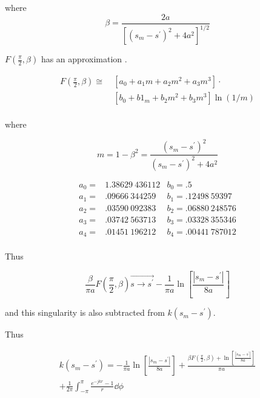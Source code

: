 \documentclass[12pt]{article}
\begin{document}
\noindent where
\[ \beta=\frac{2a}{\left[(s_m-s^\prime)^2+4a^2\right]^{1/2}}
\]

\noindent $F(\frac{\pi}{2},\beta)$ has an approximation \cite{r6}.

\begin{equation}
\begin{aligned}
F\left(\frac{\pi}{2}, \beta\right) \cong\
& [a_0 + a_1m + a_2m^2 + a_3m^3] \cdot     \\
& [b_0 + b1_m + b_2m^2 + b_3m^3]\ln(1/m)    \\
\end{aligned}
\label{eq17}
\end{equation}

where

\[
m = 1 - \beta^2 = \frac{(s_m - s^\prime)^2}{(s_m - s^\prime)^2 + 4a^2}
\]

\[
\begin{array}{lrl}
a_0 = & 1.38629\ 436112 & b_0 = .5            \\
a_1 = &  .09666\ 344259 & b_1 = .12498\ 59397  \\
a_2 = &  .03590\ 092383 & b_2 = .06880\ 248576 \\
a_3 = &  .03742\ 563713 & b_3 = .03328\ 355346 \\
a_4 = &  .01451\ 196212 & b_4 = .00441\ 787012 \\
\end{array}
\]

Thus

\begin{equation}
\frac{\beta}{\pi a}F\left(\frac{\pi}{2},\beta\right)
\overrightarrow{s\rightarrow s^\prime}
-\frac{1}{\pi a}\ln\left[\frac{|s_m - s^\prime|}{8a}\right]
\label{eq18}
\end{equation}

and this singularity is also subtracted from $k(s_m-s^\prime)$.

\clearpage
Thus

\begin{equation}
\begin{gathered}
k(s_m - s^\prime) = -\frac{1}{\pi a}\ln \left[\frac{|s_m - s^\prime|}{8a}\right]
+\frac{\beta F(\frac{\pi}{2}, \beta)
      + \ln\left[\frac{|s_m - s^\prime|}{8a}\right]}{\pi a}  \\
+ \frac{1}{2\pi}\int_{-\pi}^\pi\frac{e^{-jkr}-1}{r}\dd{\phi} \\
\end{gathered}
\label{eq19}
\end{equation}
\end{document}
